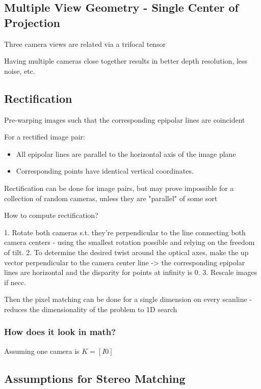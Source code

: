 \begin{enumerate}
\subsection{Multiple View Geometry - Single Center of Projection}

Three camera views are related via a trifocal tensor 

Having multiple cameras close together results in better depth resolution, less noise, etc.

\subsection{Rectification}

Pre-warping images such that the corresponding epipolar lines are coincident

For a rectified image pair:

\begin{itemize}
\item All epipolar lines are parallel to the horizontal axis of the image plane
\item Corresponding points have identical vertical coordinates.
\end{itemize}

Rectification can be done for image pairs, but may prove impossible for a collection of random cameras, unless they are "parallel" of some sort

How to compute rectification?

1. Rotate both cameras s.t. they're perpendicular to the line connecting both camera centers - using the smallest rotation possible and relying on the freedom of tilt. 
2. To determine the desired twist around the optical axes, make the up vector perpendicular to the camera center line -> the corresponding epipolar lines are horizontal and the disparity for points at infinity is 0. 
3. Rescale images if necc.

Then the pixel matching can be done for a single dimension on every scanline - reduces the dimensionality of the problem to 1D search

\subsubsection{How does it look in math?}

Assuming one camera is $K = [ I 0]$


\subsection{Assumptions for Stereo Matching}


\end{enumerate}
